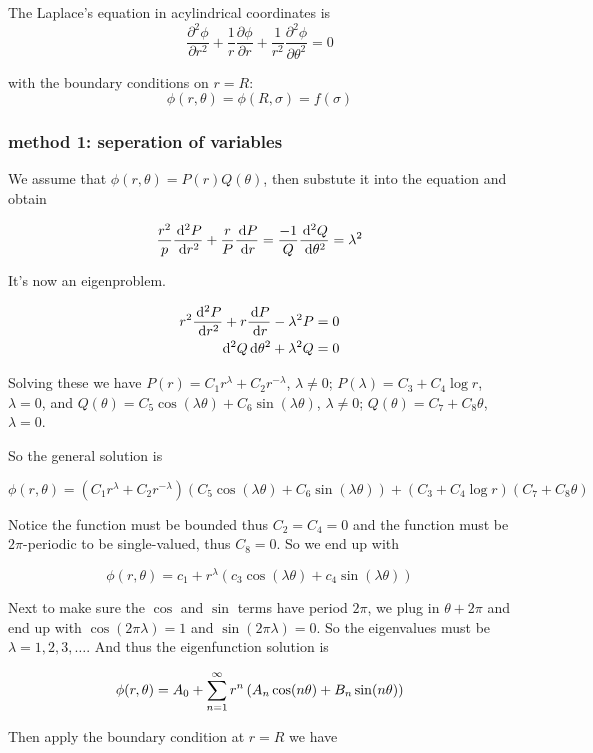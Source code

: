 \documentclass{article}
\begin{document}
The Laplace's equation in acylindrical coordinates is
\[\frac{\partial^2 \phi}{\partial r^2}+\frac{1}{r}\frac{\partial \phi}{\partial r}+\frac{1}{r^2}\frac{\partial ^2\phi}{\partial \theta^2}=0\]

with the boundary conditions on \(r=R\): 
\[\phi(r,\theta)=\phi(R,\sigma)=f(\sigma)\]

\subsubsection*{method 1: seperation of variables}
We assume that \(\phi(r,\theta)=P(r)Q(\theta)\), then substute it into the equation and obtain

\[\frac{r^2}{p}\frac{\,\mathrm{d} ^2 P}{\,\mathrm{d} r^2}+\frac{r}{P}\frac{\,\mathrm{d} P}{\,\mathrm{d} r}=\frac{-1}{Q}\frac{\,\mathrm{d} ^2Q }{\,\mathrm{d} \theta^2}=\lambda^2\]

It's now an eigenproblem.

\begin{align*}
    r^2 \frac{\,\mathrm{d} ^2 P}{\,\mathrm{d} r^2}+r\frac{\,\mathrm{d} P}{\,\mathrm{d} r}-\lambda^2 P=0\\
    {\,\mathrm{d} ^2Q }{\,\mathrm{d} \theta^2}+\lambda^2 Q = 0
\end{align*}

Solving these we have \(P(r) = C_1r^\lambda + C_2 r^{-\lambda}\), \(\lambda\neq 0\); \(P(\lambda) = C_3+C_4 \log r\), \(\lambda=0\), and \(Q(\theta) = C_5\cos(\lambda\theta)+C_6\sin(\lambda\theta)\), \(\lambda\neq 0\); \(Q(\theta) = C_7+C_8\theta\), \(\lambda=0\).

So the general solution is 

\[\phi(r,\theta)=(C_1 r^\lambda + C_2 r^{-\lambda})(C_5\cos(\lambda\theta)+C_6\sin(\lambda\theta))+(C_3+C_4 \log r)(C_7+C_8\theta)\]

Notice the function must be bounded thus \(C_2=C_4=0\) and the function must be \(2\pi\)-periodic to be single-valued, thus \(C_8=0\). So we end up with

\[\phi(r,\theta) = c_1 + r^\lambda(c_3 \cos(\lambda\theta)+c_4 \sin(\lambda\theta))\]

Next to make sure the \(\cos\) and \(\sin\) terms have period \(2\pi\), we plug in \(\theta+2\pi\) and end up with \(\cos(2\pi\lambda)=1\) and \(\sin(2\pi\lambda)=0\). So the eigenvalues must be \(\lambda=1,2,3,\dots\). And thus the eigenfunction solution is 

\[\phi(r,\theta) = A_0+\sum_{n=1}^\infty r^n \left( A_n \cos(n\theta)+B_n\sin(n\theta) \right)\]

Then apply the boundary condition at \(r=R\) we have
\end{document}
